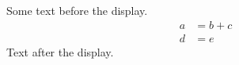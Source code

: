 \documentclass[12pt]{article}
\begin{document}
Some text before the display.
\[ \begin{aligned} a &= b + c \\ d &= e \end{aligned} \]
Text after the display.
\end{document}
